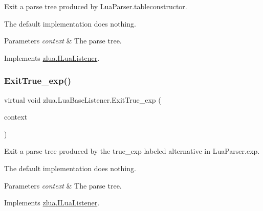 Exit a parse tree produced by Lua\+Parser.\+tableconstructor. 

The default implementation does nothing.


\begin{DoxyParams}{Parameters}
{\em context} & The parse tree.\\
\hline
\end{DoxyParams}


Implements \mbox{\hyperlink{interfacezlua_1_1_i_lua_listener_ae19198d7c5130d70ca8ffa5ff81c168e}{zlua.\+I\+Lua\+Listener}}.

\mbox{\label{classzlua_1_1_lua_base_listener_a1f4f2a7162ad93c54ae0c86a15233bac}} 
\subsubsection{\texorpdfstring{Exit\+True\+\_\+exp()}{ExitTrue\_exp()}}
{\footnotesize\ttfamily virtual void zlua.\+Lua\+Base\+Listener.\+Exit\+True\+\_\+exp (\begin{DoxyParamCaption}\item[{\mbox{[}\+Not\+Null\mbox{]} \mbox{\hyperlink{classzlua_1_1_lua_parser_1_1_true__exp_context}{Lua\+Parser.\+True\+\_\+exp\+Context}}}]{context }\end{DoxyParamCaption})\hspace{0.3cm}{\ttfamily [virtual]}}



Exit a parse tree produced by the {\ttfamily true\+\_\+exp} labeled alternative in Lua\+Parser.\+exp. 

The default implementation does nothing.


\begin{DoxyParams}{Parameters}
{\em context} & The parse tree.\\
\hline
\end{DoxyParams}


Implements \mbox{\hyperlink{interfacezlua_1_1_i_lua_listener_a9d5a4a9bd56969dc9b5269fd3049187d}{zlua.\+I\+Lua\+Listener}}.

\mbox{\label{classzlua_1_1_lua_base_listener_a37244bd0d8813ac29d8b841496ff4a75}} 
